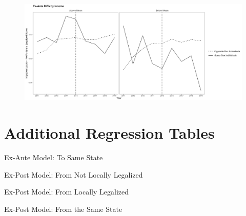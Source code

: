 \documentclass[12pt,letterpaper]{article}
\begin{document}
\begin{figure}[h]
    \centering
    \includegraphics[width=0.75\linewidth]{outputs/summary_stats/inc_ante_diffs.png}
    \caption{}
    \label{fig: fig:enter-label}
\end{figure}

\FloatBarrier
\newpage
\section{Additional Regression Tables}
\begin{table}[h] %
    \centering
    \caption{Ex-Ante Model: To Same State}
    \label{tab: tstay_exante_model}
    
\end{table}
\begin{table}[h]
    \centering
    \caption{Ex-Post Model: From Not Locally Legalized}
    \label{tab: ffed_expost_model}
    
\end{table}
\begin{table}[h] %
    \centering
    \caption{Ex-Post Model: From Locally Legalized}
    \label{tab: flocal_expost_model}
    
\end{table}
\begin{table}[h]
    \centering
    \caption{Ex-Post Model: From the Same State}
    \label{tab: fstay_expost_model}
    
\end{table}
\end{document}
